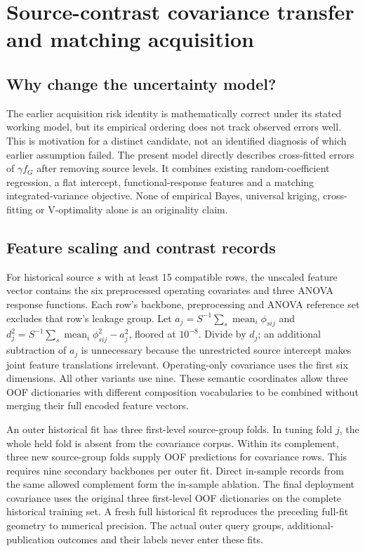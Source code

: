 \clearpage
\section{Source-contrast covariance transfer and matching acquisition}
\subsection{Why change the uncertainty model?}
The earlier acquisition risk identity is mathematically correct under its stated working model, but its empirical ordering does not track observed errors well. This is motivation for a distinct candidate, not an identified diagnosis of which earlier assumption failed. The present model directly describes cross-fitted errors of $\gamma f_G$ after removing source levels. It combines existing random-coefficient regression, a flat intercept, functional-response features and a matching integrated-variance objective. None of empirical Bayes, universal kriging, cross-fitting or V-optimality alone is an originality claim.

\subsection{Feature scaling and contrast records}
For historical source $s$ with at least 15 compatible rows, the unscaled feature vector contains the six preprocessed operating covariates and three ANOVA response functions. Each row's backbone, preprocessing and ANOVA reference set excludes that row's leakage group. Let $a_j=S^{-1}\sum_s\operatorname{mean}_i \phi_{sij}$ and $d_j^2=S^{-1}\sum_s\operatorname{mean}_i\phi_{sij}^2-a_j^2$, floored at $10^{-8}$. Divide by $d_j$; an additional subtraction of $a_j$ is unnecessary because the unrestricted source intercept makes joint feature translations irrelevant. Operating-only covariance uses the first six dimensions. All other variants use nine. These semantic coordinates allow three OOF dictionaries with different composition vocabularies to be combined without merging their full encoded feature vectors.

An outer historical fit has three first-level source-group folds. In tuning fold $j$, the whole held fold is absent from the covariance corpus. Within its complement, three new source-group folds supply OOF predictions for covariance rows. This requires nine secondary backbones per outer fit. Direct in-sample records from the same allowed complement form the in-sample ablation. The final deployment covariance uses the original three first-level OOF dictionaries on the complete historical training set. A fresh full historical fit reproduces the preceding full-fit geometry to numerical precision. The actual outer query groups, additional-publication outcomes and their labels never enter these fits.

